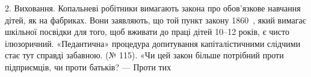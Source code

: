 2. Виховання. Копальневі робітники вимагають закона про
обов’язкове навчання дітей, як на фабриках. Вони заявляють,
що той пункт закону 1860~, який вимагає шкільної посвідки для
того, щоб вживати до праці дітей 10--12 років, є чисто ілюзоричний.
«Педантична» процедура допитування капіталістичними
слідчими стає тут справді забавною. (№ 115). «Чи цей закон більше
потрібний проти підприємців, чи проти батьків? — Проти тих
\parbreak{}  %
